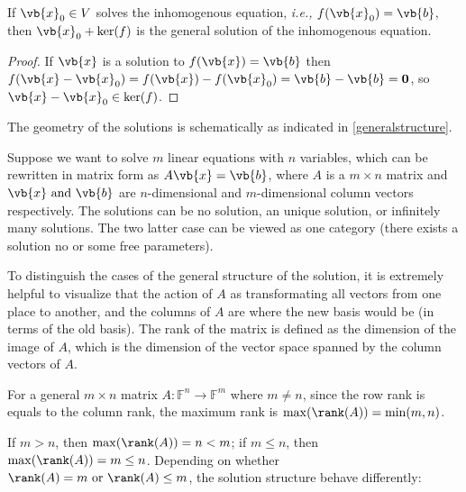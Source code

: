 \documentclass[a4paper,12pt]{report}
\begin{document}
\begin{lemma}
If \(\vb{x} _{0} \in V\) solves the inhomogenous equation, \textit{i.e.,} \(f(\vb{x} _{0} ) = \vb{b}\), then \(\vb{x} _{0} + \ker (f) \) is the general solution of the inhomogenous equation.   
\end{lemma}

\begin{proof}
If \(\vb{x} \) is a solution to \(f(\vb{x} ) = \vb{b} \) then \(f(\vb{x} - \vb{x} _{0} ) = f(\vb{x} ) - f(\vb{x} _{0} ) = \vb{b} -\vb{b} =\boldsymbol{0} \), so \(\vb{x} - \vb{x} _{0} \in \ker (f) \).     
\end{proof}

The geometry of the solutions is schematically as indicated in \cref{generalstructure}.


Suppose we want to solve \(m\) linear equations with \(n\) variables, which can be rewritten in matrix form as \(A\vb{x} = \vb{b} \), where \(A\) is a \(m \times n\) matrix and \(\vb{x} \text { and } \vb{b} \) are \(n\)-dimensional and \(m\)-dimensional column vectors respectively. The solutions can be no solution, an unique solution, or infinitely many solutions. The two latter case can be viewed as one category (there exists a solution no or some free parameters).

To distinguish the cases of the general structure of the solution, it is extremely helpful to visualize that the action of \(A\) as transformating all vectors from one place to another, and the columns of \(A\) are where the new basis would be (in terms of the old basis). The rank of the matrix is defined as the dimension of the image of \(A\), which is the dimension of the vector space spanned by the column vectors of \(A\). 

For a general \(m \times n\) matrix \(A:\mathbb{F}^{n}\to \mathbb{F}^{m}  \) where \(m \neq n\), since the row rank is equals to the column rank, the maximum rank is \(\max (\rank (A)) = \min (m,n)\). 

If \(m > n\), then \(\max (\rank (A)) = n < m\); if \(m \le n\), then \(\max (\rank (A)) = m \le n\). Depending on whether \(\rank (A) = m \text { or } \rank (A) \le m\), the solution structure behave differently:  
\end{document}
